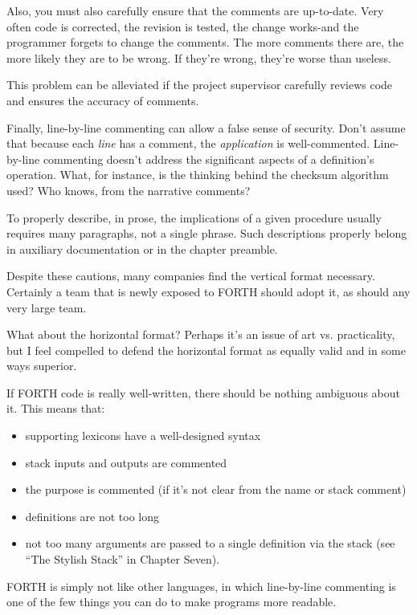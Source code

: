 Also, you must also carefully ensure that the comments are up-to-date.
Very often code is corrected, the revision is tested, the change
works-and the programmer forgets to change the comments.  The more
comments there are, the more likely they are to be wrong.  If they're
wrong, they're worse than useless.

This problem can be alleviated if the project supervisor carefully reviews
code and ensures the accuracy of comments.

Finally, line-by-line commenting can allow a false sense of security.
Don't assume that because each \emph{line} has a comment, the \emph{application} is
well-commented.  Line-by-line commenting doesn't address the significant
aspects of a definition's operation.  What, for instance, is the thinking
behind the checksum algorithm used? Who knows, from the narrative
comments?

To properly describe, in prose, the implications of a given procedure
usually requires many paragraphs, not a single phrase.  Such descriptions
properly belong in auxiliary documentation or in the chapter preamble.

Despite these cautions, many companies find the vertical format
necessary.  Certainly a team that is newly exposed to FORTH should
adopt it, as should any very large team.

What about the horizontal format? Perhaps it's an issue of art vs.
practicality, but I feel compelled to defend the horizontal format as equally
valid and in some ways superior.

If FORTH code is really well-written, there should be nothing ambiguous
about it.  This means that:
\begin{itemize}
\item supporting lexicons have a well-designed syntax
\item stack inputs and outputs are commented
\item the purpose is commented (if it's not clear from the name or stack comment)
\item definitions are not too long
\item not too many arguments are passed to a single definition via the stack (see
``The Stylish Stack'' in Chapter Seven).
\end{itemize}
FORTH is simply not like other languages, in which line-by-line
commenting is one of the few things you can do to make programs more
readable.

